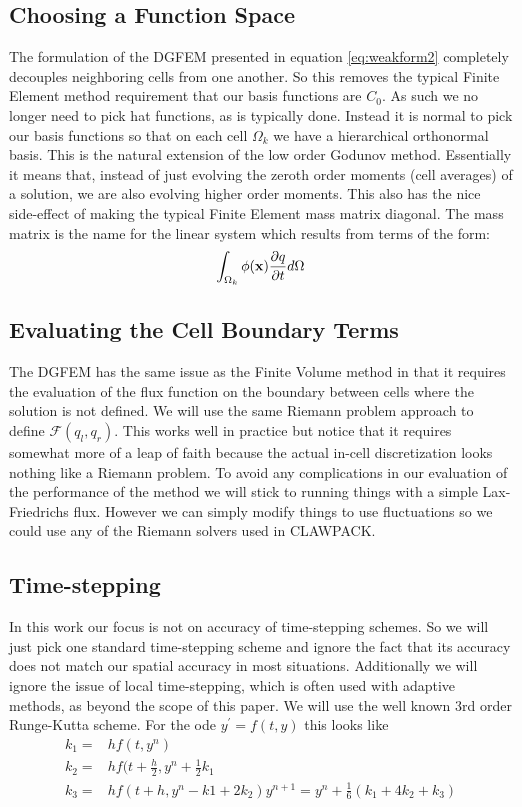 \documentclass[10]{amsart}
\begin{document}
 \subsection{Choosing a Function Space}
 The formulation of the DGFEM presented in equation \eqref{eq:weakform2} completely decouples neighboring cells from one another.
 So this removes the typical Finite Element method requirement that our basis functions are $C_0$. As such we no longer
 need to pick hat functions, as is typically done. Instead it is normal to pick our basis functions so that on each
 cell $\Omega_k$ we have a hierarchical orthonormal basis. This is the natural extension of the low order Godunov method.
 Essentially it means that, instead of just evolving the zeroth order moments (cell averages) of a solution, we are also
 evolving higher order moments. This also has the nice side-effect of making the typical Finite Element mass matrix  
 diagonal. The mass matrix is the name for the linear system which results from terms of the form:
 $$\int_{\Omega_k} \phi({\bf x}) \frac{\partial q}{\partial t} d\Omega $$
 \subsection{Evaluating the Cell Boundary Terms}
 The DGFEM has the same issue as the Finite Volume method in that it requires the evaluation of the flux function
 on the boundary between cells where the solution is not defined. 
 We will use the same Riemann problem approach to define $\mathcal{F}(q_l,q_r)$.
 This works well in practice but notice that it requires somewhat
 more of a leap of faith because the actual in-cell discretization looks nothing like a Riemann problem.
 To avoid any complications in our evaluation of the performance of the method we will stick to running things with
 a simple Lax-Friedrichs flux. However we can simply modify things to use fluctuations so we could use any of the Riemann
 solvers used in CLAWPACK.
 \subsection{Time-stepping}
 In this work our focus is not on accuracy of time-stepping schemes. So we will just pick one standard
 time-stepping scheme and ignore the fact that its accuracy does not match our spatial accuracy in most situations.
 Additionally we will ignore the issue of local time-stepping, which is often used with adaptive methods, as beyond the
 scope of this paper. We will use the well known $3$rd order Runge-Kutta scheme. For the ode $y^{'}=f(t,y)$ this looks like
 \begin{align*}
  k_1=&hf(t,y^n)\\
  k_2=&h f(t+\frac{h}{2},y^n+\frac{1}{2}k_1\\
  k_3=&h f(t+h,y^n - k1 +2 k_2)
  y^{n+1}=y^n+\frac{1}{6} \left(k_1 + 4 k_2 + k_3\right)
 \end{align*}
\end{document}
